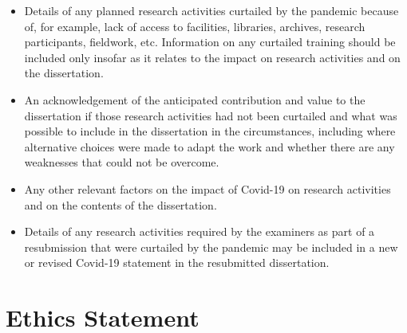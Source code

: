 \documentclass[oneside,%
                    author={Malak Hajji},
                    degree={BSc},
                    title={Designing An Accessible Computational Toolkit For Students},
                  subtitle={With Mixed Visual Abilities}]{dissertation}
\begin{document}
\begin{itemize}
\item Details of any planned research activities curtailed by the pandemic because of, for example, lack of access to facilities, libraries, archives, research participants, fieldwork, etc. Information on any curtailed training should be included only insofar as it relates to the impact on research activities and on the dissertation.

\item An acknowledgement of the anticipated contribution and value to the dissertation if those research activities had not been curtailed and what was possible to include in the dissertation in the circumstances, including where alternative choices were made to adapt the work and whether there are any weaknesses that could not be overcome.

\item Any other relevant factors on the impact of Covid-19 on research activities and on the contents of the dissertation.

\item Details of any research activities required by the examiners as part of a resubmission that were curtailed by the pandemic may be included in a new or revised Covid-19 statement in the resubmitted dissertation.
\end{itemize}



\makedecl





\tableofcontents
\listoffigures
\listoftables




\chapter*{Ethics Statement}
\end{document}
